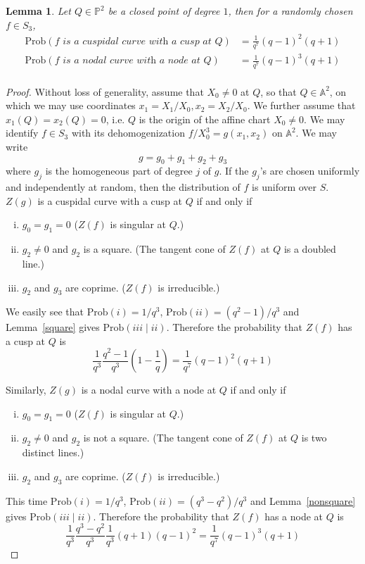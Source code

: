 \documentclass[12pt]{article}
\theoremstyle{plain}
\newtheorem{lemma}[equation]{Lemma}
\theoremstyle{definition}
\newcommand{\IA}{\mathbb{A}}
\newcommand{\IP}{\mathbb{P}}
\newcommand{\<}{\langle}
\renewcommand{\>}{\rangle}
\newcommand{\Prob}{\mathrm{Prob}}
\begin{document}
\begin{lemma}
\label{mainlemma}
Let $Q \in \IP^2$ be a closed point of degree $1$, then for a randomly chosen $f \in S_3$,
\begin{align*}
\Prob(f \textit{ is a cuspidal curve with a cusp at } Q) &= \frac{1}{q^7}(q - 1)^2(q + 1) \\
\Prob(f \textit{ is a nodal curve with a node at } Q) &= \frac{1}{q^7}(q - 1)^3(q + 1) \\
\end{align*} 
\end{lemma}
\begin{proof}
Without loss of generality, assume that $X_0 \neq 0$ at $Q$, so that $Q \in \IA^2$, on which we may use coordinates $x_1 = X_1/X_0, x_2 = X_2/X_0$. We further assume that $x_1(Q) = x_2(Q) = 0$, i.e. $Q$ is the origin of the affine chart $X_0 \neq 0$. We may identify $f \in S_3$ with its dehomogenization $f/X_0^3 = g(x_1, x_2)$ on $\IA^2$. We may write 
$$ g = g_0 + g_1 + g_2 + g_3 $$
where $g_j$ is the homogeneous part of degree $j$ of $g$. If the $g_j$'s are chosen uniformly and independently at random, then the distribution of $f$ is uniform over $S$. $Z(g)$ is a cuspidal curve with a cusp at $Q$ if and only if 
\begin{enumerate}[i.]
\item $g_0 = g_1 = 0$ ($Z(f)$ is singular at $Q$.) 
\item $g_2 \neq 0$ and $g_2$ is a square. (The tangent cone of $Z(f)$ at $Q$ is a doubled line.)
\item $g_2$ and $g_3$ are coprime. ($Z(f)$ is irreducible.)
\end{enumerate} We easily see that $\Prob(i) = 1/q^3$, $\Prob(ii) = (q^2 - 1)/q^3$ and Lemma~\ref{square} gives $\Prob(iii \mid ii)$. Therefore the probability that $Z(f)$ has a cusp at $Q$ is 
$$ \frac{1}{q^3} \frac{q^2 - 1}{q^3} (1 - \frac{1}{q}) = \frac{1}{q^7}(q - 1)^2(q + 1) $$

Similarly, $Z(g)$ is a nodal curve with a node at $Q$ if and only if 
\begin{enumerate}[i.]
\item $g_0 = g_1 = 0$ ($Z(f)$ is singular at $Q$.) 
\item $g_2 \neq 0$ and $g_2$ is not a square. (The tangent cone of $Z(f)$ at $Q$ is two distinct lines.)
\item $g_2$ and $g_3$ are coprime. ($Z(f)$ is irreducible.)
\end{enumerate}
This time $\Prob(i) = 1/q^3$, $\Prob(ii) = (q^3 - q^2)/q^3$ and Lemma~\ref{nonsquare} gives $\Prob(iii \mid ii)$. Therefore the probability that $Z(f)$ has a node at $Q$ is 
$$ \frac{1}{q^3} \frac{q^3 - q^2}{q^3} \frac{1}{q^3}(q + 1)(q - 1)^2 = \frac{1}{q^7}(q - 1)^3(q + 1) $$
\end{proof}
\end{document}
